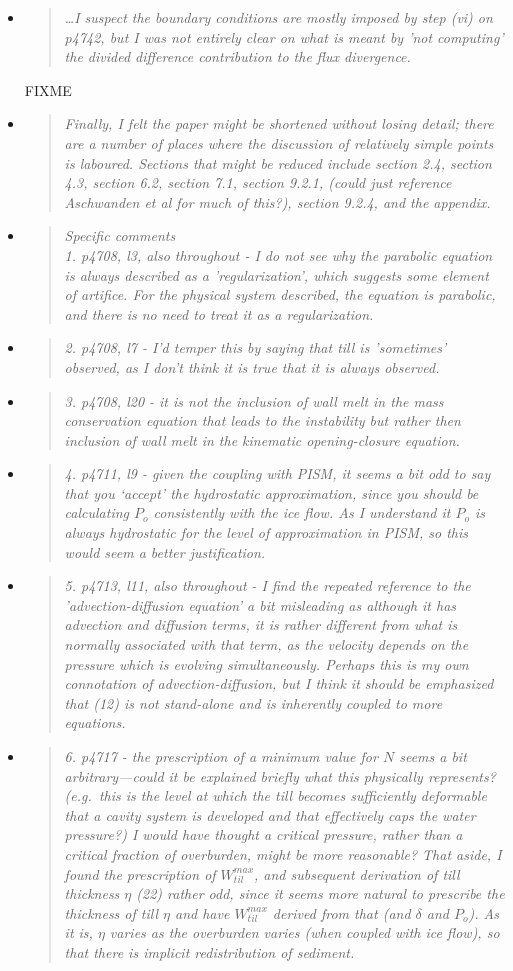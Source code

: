 \documentclass[11pt,reqno]{amsart}
\newcommand{\reply}[2]{
\medskip\medskip
\item  \begin{quote}
\emph{#1}
\end{quote}

\medskip
\noindent #2}
\begin{document}
\begin{itemize}
\reply{ \dots  I suspect the boundary conditions are mostly imposed by step (vi) on p4742, but I was not entirely clear on what is meant by 'not computing' the divided difference contribution to the flux divergence.}
{FIXME}

\reply{Finally, I felt the paper might be shortened without losing detail; there are a number
of places where the discussion of relatively simple points is laboured. Sections that
might be reduced include section 2.4, section 4.3, section 6.2, section 7.1, section
9.2.1, (could just reference Aschwanden et al for much of this?), section 9.2.4, and the
appendix.}
{}

\reply{Specific comments\\
1. p4708, l3, also throughout - I do not see why the parabolic equation is always
described as a 'regularization', which suggests some element of artifice. For the
physical system described, the equation is parabolic, and there is no need to
treat it as a regularization.}
{}

\reply{2. p4708, l7 - I’d temper this by saying that till is 'sometimes' observed, as I don’t
think it is true that it is always observed.}
{}

\reply{3. p4708, l20 - it is not the inclusion of wall melt in the mass conservation equation
that leads to the instability but rather then inclusion of wall melt in the kinematic
opening-closure equation.}
{}

\reply{4. p4711, l9 - given the coupling with PISM, it seems a bit odd to say that you
‘accept’ the hydrostatic approximation, since you should be calculating $P_o$ consistently with the ice flow. As I understand it $P_o$ is always hydrostatic for the level
of approximation in PISM, so this would seem a better justification.}
{}

\reply{5. p4713, l11, also throughout - I find the repeated reference to the 'advection-diffusion equation' a bit misleading as although it has advection and diffusion
terms, it is rather different from what is normally associated with that term, as the
velocity depends on the pressure which is evolving simultaneously.  Perhaps this
is my own connotation of advection-diffusion, but I think it should be emphasized
that (12) is not stand-alone and is inherently coupled to more equations.}
{}

\reply{6. p4717 - the prescription of a minimum value for $N$ seems a bit arbitrary---could
it be explained briefly what this physically represents? (e.g.~this is the level at which the till becomes sufficiently deformable that a cavity system is developed and that effectively caps the water pressure?) I would have thought a critical pressure, rather than a critical fraction of overburden, might be more reasonable? That aside, I found the prescription of $W_{til}^{max}$, and subsequent derivation of till thickness $\eta$ (22) rather odd, since it seems more natural to prescribe the thickness of till $\eta$ and have $W_{til}^{max}$ derived from that (and $\delta$ and $P_o$).  As it is, $\eta$ varies as the overburden varies (when coupled with ice flow), so that there is implicit redistribution of sediment.}
{}


\end{itemize}
\end{document}
